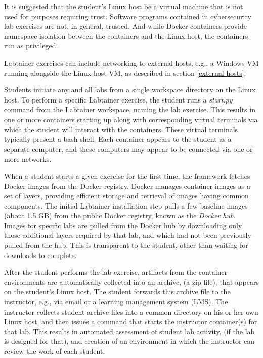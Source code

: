 \documentclass[12pt]{article}
\begin{document}
It is suggested that the student's Linux host be a virtual machine that is
not used for purposes requiring trust.  Software programs contained in cybersecurity lab
exercises are not, in general, trusted.  And while Docker containers provide namespace
isolation between the containers and the Linux host, the containers run as privileged.

Labtainer exercises can include networking to external hosts, e.g., a Windows VM
running alongside the Linux host VM, as described in section \ref{external hosts}.

Students initiate any and all labs from a
single workspace directory on the Linux host.
To perform a specific Labtainer exercise, the student runs a \textit{start.py} command from
the Labtainer workspace, naming the lab exercise.  This results in one or more
containers starting up along with corresponding virtual terminals via which the 
student will interact with the containers.  These virtual terminals typically
present a bash shell.  Each container appears to the student as a separate
computer, and these computers may appear to be connected via one or more networks.  

When a student starts a given exercise for the first time, the framework fetches
Docker images from the Docker registry.  Docker manages container images as a set of
layers, providing efficient storage and retrieval of images having common components.
The initial Labtainer installation step pulls a few baseline images (about 1.5 GB) from 
the public
Docker registry, known as the \textit{Docker hub}.  Images for specific labs are pulled
from the Docker hub by downloading only those additional layers required by that lab, and
which had not been previously pulled from the hub.  This is transparent to
the student, other than waiting for downloads to complete.

After the student performs the lab exercise, artifacts from the container
environments are automatically collected into an archive, (a zip file), that appears on
the student's Linux host.  The student forwards this archive file to the instructor,
e.g., via email or a learning management system (LMS).  The instructor collects student archive files into a common
directory on his or her own Linux host, and then issues a command that starts
the instructor container(s) for that lab.  This results in automated assessment of student lab
activity, (if the lab is designed for that), and creation of an environment
in which the instructor can review the work of each student.
\end{document}
